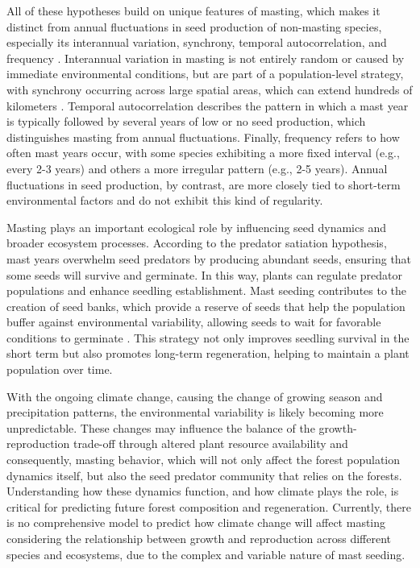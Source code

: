\documentclass[11pt,letter]{article}
\begin{document}
All of these hypotheses build on unique features of masting, which makes it distinct from annual fluctuations in seed production of non-masting species, especially its interannual variation, synchrony, temporal autocorrelation, and frequency \citep{hacket2021climate}. Interannual variation in masting is not entirely random or caused by immediate environmental conditions, but are part of a population-level strategy, with synchrony occurring across large spatial areas, which can extend hundreds of kilometers \citep{kelly1994evolutionary}. Temporal autocorrelation describes the pattern in which a mast year is typically followed by several years of low or no seed production, which distinguishes masting from annual fluctuations. Finally, frequency refers to how often mast years occur, with some species exhibiting a more fixed interval (e.g., every 2-3 years) and others a more irregular pattern (e.g., 2-5 years). Annual fluctuations in seed production, by contrast, are more closely tied to short-term environmental factors and do not exhibit this kind of regularity. \par
Masting plays an important ecological role by influencing seed dynamics and broader ecosystem processes. According to the predator satiation hypothesis, mast years overwhelm seed predators by producing abundant seeds, ensuring that some seeds will survive and germinate. In this way, plants can regulate predator populations and enhance seedling establishment. Mast seeding contributes to the creation of seed banks, which provide a reserve of seeds that help the population buffer against environmental variability, allowing seeds to wait for favorable conditions to germinate \citep{venable1989modeling}. This strategy not only improves seedling survival in the short term but also promotes long-term regeneration, helping to maintain a plant population over time.\par
With the ongoing climate change, causing the change of growing season and precipitation patterns, the environmental variability is likely becoming more unpredictable. These changes may influence the balance of the growth-reproduction trade-off through altered plant resource availability and consequently, masting behavior, which will not only affect the forest population dynamics itself, but also the seed predator community that relies on the forests. Understanding how these dynamics function, and how climate plays the role, is critical for predicting future forest composition and regeneration. Currently, there is no comprehensive model to predict how climate change will affect masting considering the relationship between growth and reproduction across different species and ecosystems, due to the complex and variable nature of mast seeding.\par
\end{document}
